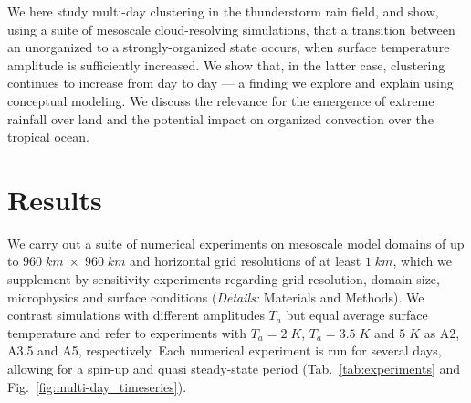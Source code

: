 \documentclass[draft,linenumbers]{agujournal2019}
\begin{document}
We here study multi-day clustering in the thunderstorm rain field, and show, using a suite of mesoscale cloud-resolving simulations, that a transition between an unorganized to a strongly-organized state occurs, when surface temperature amplitude is sufficiently increased. 
We show that, in the latter case, clustering continues to increase from day to day --- a finding we explore and explain using conceptual modeling.
We discuss the relevance for the emergence of extreme rainfall over land and the potential impact on organized convection over the tropical ocean.

\section*{Results}\label{sec:results}
\noindent
We carry out a suite of numerical experiments on mesoscale model domains of up to $960\;km\;\times\;960\;km$ and horizontal grid resolutions of at least $1\;km$, which we supplement by sensitivity experiments regarding grid resolution, domain size, microphysics and surface conditions ({\it Details:} Materials and Methods).
We contrast simulations with different amplitudes $T_a$ but equal average surface temperature and refer to experiments with $T_a=2\;K$, $T_a=3.5\;K$ and $5\;K$ as A2, A3.5 and A5, respectively.
Each numerical experiment is run for several days, allowing for a spin-up and quasi steady-state period (Tab.~\ref{tab:experiments} and Fig.~\ref{fig:multi-day_timeseries}). 
\end{document}
